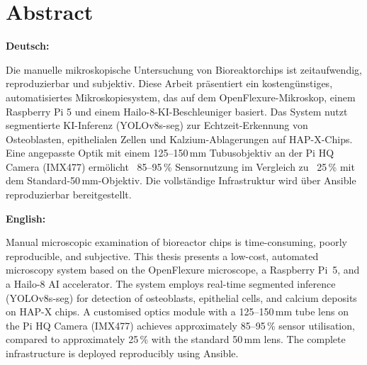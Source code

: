 \chapter*{Abstract}

\textbf{Deutsch:}

Die manuelle mikroskopische Untersuchung von Bioreaktorchips ist zeitaufwendig,
reproduzierbar und subjektiv. Diese Arbeit präsentiert ein kostengünstiges,
automatisiertes Mikroskopiesystem, das auf dem OpenFlexure-Mikroskop, einem
Raspberry Pi 5 und einem Hailo-8-KI-Beschleuniger basiert. Das System nutzt
segmentierte KI-Inferenz (YOLOv8s-seg) zur Echtzeit-Erkennung von Osteoblasten,
epithelialen Zellen und Kalzium-Ablagerungen auf HAP-X-Chips. Eine angepasste
Optik mit einem 125--150\,mm Tubusobjektiv an der Pi HQ Camera (IMX477) ermölicht
~85--95\,\% Sensornutzung im Vergleich zu ~25\,\% mit dem Standard-50\,mm-Objektiv.
Die vollständige Infrastruktur wird über Ansible reproduzierbar bereitgestellt.

\vspace{0.7\baselineskip}

\textbf{English:}

Manual microscopic examination of bioreactor chips is time-consuming, poorly
reproducible, and subjective. This thesis presents a low-cost, automated
microscopy system based on the OpenFlexure microscope, a Raspberry Pi~5, and a
Hailo-8 AI accelerator. The system employs real-time segmented inference
(YOLOv8s-seg) for detection of osteoblasts, epithelial cells, and calcium deposits
on HAP-X chips. A customised optics module with a 125--150\,mm tube lens on the Pi
HQ Camera (IMX477) achieves approximately 85--95\,\% sensor utilisation, compared to
approximately 25\,\% with the standard 50\,mm lens. The complete infrastructure is
deployed reproducibly using Ansible.
